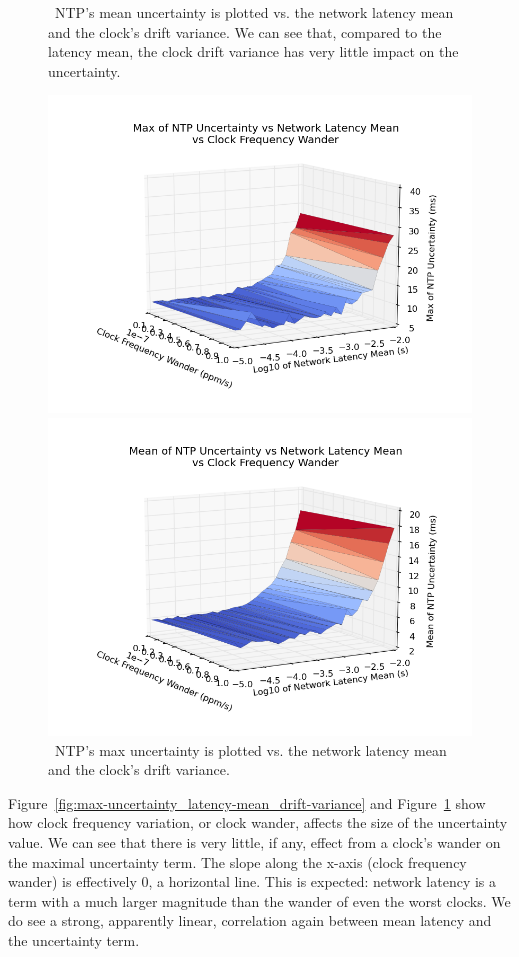 \begin{figure}[!htbp]
  \caption{~NTP's mean uncertainty is plotted vs. the network latency mean and the clock's drift variance. We can see that, compared to the latency mean, the clock drift variance has very little impact on the uncertainty.}
  \label{fig:max-uncertainty_latency-mean_drift-variance}
  \includegraphics[width=0.8\linewidth]{max_max_err-mean_latency-drift_variance.png}

  \caption{~NTP's max uncertainty is plotted vs. the network latency mean and the clock's drift variance.}
  \label{fig:mean-uncertainty_latency-mean_drift-variance}
  \includegraphics[width=0.8\linewidth]{mean_max_err-mean_latency-drift_variance.png}
\end{figure}

Figure~\ref{fig:max-uncertainty_latency-mean_drift-variance} and
Figure~\ref{fig:mean-uncertainty_latency-mean_drift-variance} show how
clock frequency variation, or clock wander, affects the size of the
uncertainty value.  We can see that there is very little, if any,
effect from a clock's wander on the maximal uncertainty term. The
slope along the x-axis (clock frequency wander) is effectively 0, a
horizontal line. This is expected: network latency is a term with a
much larger magnitude than the wander of even the worst clocks. We do
see a strong, apparently linear, correlation again between mean
latency and the uncertainty term.

